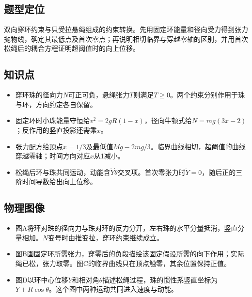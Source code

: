 \documentclass[UTF8,fontset=fandol,a4paper,11pt]{ctexart}
\begin{document}


\subsection*{题型定位}

双向穿环约束与只受拉悬绳组成的约束转换。先用固定环能量和径向受力得到张力抛物线，确定其最低点及首次零点；再说明相切临界与穿越零轴的区别，并用首次松绳后的耦合方程证明超阈值时的向上位移。



\subsection*{知识点}

\begin{itemize}
\item 穿环珠的径向力$N$可正可负，悬绳张力$T$则满足$T\ge0$。两个约束分别作用于珠与环，方向约定各自保留。
\item 固定环时小珠能量守恒给$v^2=2gR(1-x)$，径向牛顿式给$N=mg(3x-2)$；反作用的竖直投影还需乘$x$。
\item 张力配方给顶点$x=1/3$及最低值$Mg-2mg/3$。临界曲线相切，超阈值的曲线穿越零轴；时间方向对应$x$从1减小。
\item 松绳后环与珠共同运动，动能含$\dot Y\dot\theta$交叉项。首次零张力时$\ddot Y=0$，随后正的三阶时间导数给出向上位移。
\end{itemize}



\subsection*{物理图像}

\begin{itemize}
\item 图A将环对珠的径向力与珠对环的反力分开，左右珠的水平分量抵消，竖直分量相加。$N$变号时由推变拉，穿环约束继续成立。
\item 图B画固定环所需张力，穿零后的负段描绘该固定假设所需的向下作用；实际绳已松，张力取零。图C的临界曲线只在顶点触零，其余位置保持正值。
\item 图D以环中心位移$Y$和相对角$\theta$描述松绳过程，珠的惯性系竖直坐标为$Y+R\cos\theta$。这个图中两种运动共同进入速度与动能。
\end{itemize}
\end{document}
